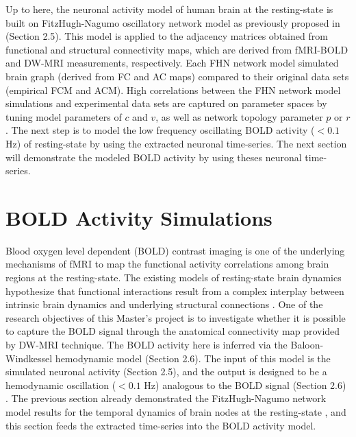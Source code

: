 Up to here, the neuronal activity model of human brain at the resting-state is built on FitzHugh-Nagumo oscillatory network model as previously proposed in \citep{VUK13, GHO08a} (Section 2.5). This model is applied to the adjacency matrices obtained from functional and structural connectivity maps, which are derived from fMRI-BOLD and DW-MRI measurements, respectively. Each FHN network model simulated brain graph (derived from FC and AC maps) compared to their original data sets (empirical FCM and ACM). High correlations between the FHN network model simulations and experimental data sets are captured on parameter spaces by tuning model parameters of $c$ and $v$, as well as network topology parameter $p$ or $r$ \citep{VUK13, GHO08a}. The next step is to model the low frequency oscillating BOLD activity ($<0.1$ Hz) of resting-state by using the extracted neuronal time-series. The next section will demonstrate the modeled BOLD activity by using theses neuronal time-series. 


\section{BOLD Activity Simulations}

Blood oxygen level dependent (BOLD) contrast imaging is one of the underlying mechanisms of fMRI to map the functional activity correlations among brain regions at the resting-state. The existing models of resting-state brain dynamics hypothesize that functional interactions result from a complex interplay between intrinsic brain dynamics and underlying structural connections \citep{RUB09}. One of the research objectives of this Master's project is to investigate whether it is possible to capture the BOLD signal through the anatomical connectivity map provided by DW-MRI technique. The BOLD activity here is inferred via the Baloon-Windkessel hemodynamic model \citep{FRI00}(Section 2.6). The input of this model is the simulated neuronal activity (Section 2.5), and the output is designed to be a hemodynamic oscillation ($<0.1$ Hz) analogous to the BOLD signal (Section 2.6) \citep{FRI00}. The previous section already demonstrated the FitzHugh-Nagumo network model results for the temporal dynamics of brain nodes at the resting-state \citep{VUK13, GHO08a}, and this section feeds the extracted time-series into the BOLD activity model. 

